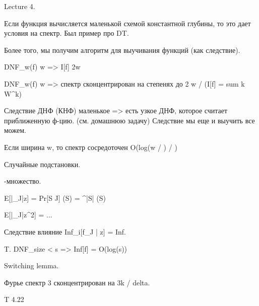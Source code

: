 Lecture 4.


Если функция вычисляется маленькой схемой константной глубины, то это дает условия на спектр.
Был пример про DT.

Более того, мы получим алгоритм для выучивания функций (как следствие).


DNF_w(f) \le w => I[f] \le 2w

DNF_w(f) \le w => спектр сконцентрирован на степенях до 2 w / \epsilon (I[f] = sum k W^k)

Следствие ДНФ (КНФ) маленькое => есть узкое ДНФ, которое считает приближенную ф-цию. (см. домашнюю задачу)
Следствие мы еще и выучить все можем.


Если ширина w, то спектр сосредоточен O(log(w / \epsilon) / \epsilon)




Случайные подстановки.

\delta-множество.

E[|_{J|z}] = Pr[S \in J] (S) = \delta^{|S|} (S)

E[|_{J|z}^2] = ...


Следствие влияние Inf_i[f_{J | z}] = \delta Inf.


T. DNF_size < s => Inf[f] = O(log(s))



Switching lemma.

Фурье спектр 3 \epsilon  сконцентрирован на 3k / delta.

T 4.22